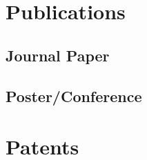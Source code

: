 \documentclass{resume}
\begin{document}
\nocite{*} %
\section{Publications}
\subsection{Journal Paper}
\begin{refsection}[paper]
  \nocite{*}
  \printbibliography[heading=none, title={ }]
\end{refsection}

\subsection{Poster/Conference}
\begin{refsection}[conference]
  \nocite{*}
  \printbibliography[heading=none, title={ }]
\end{refsection}

\vspace{5mm}
\section{Patents}
\begin{refsection}[patent]
  \nocite{*}
  \printbibliography[heading=none, title={ }]
\end{refsection}
\end{document}

